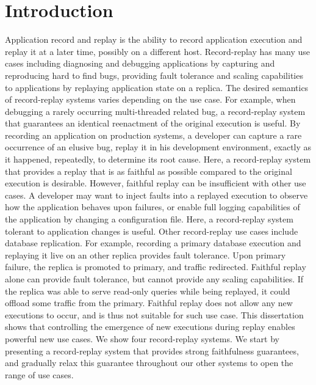 \chapter{Introduction}
\label{ch:intro}

Application record and replay is the ability to record application execution and
replay it at a later time, possibly on a different host. Record-replay has many
use cases including diagnosing and debugging applications by capturing and
reproducing hard to find bugs, providing fault tolerance and scaling
capabilities to applications by replaying application state on a replica.
The desired semantics of record-replay systems varies depending on the use case.
For example, when debugging a rarely occurring multi-threaded related bug,
a record-replay system that guarantees an identical reenactment of the original
execution is useful. By recording an application on production
systems, a developer can capture a rare occurrence of an elusive bug, replay it
in his development environment, exactly as it happened, repeatedly, to
determine its root cause. Here, a record-replay system that provides
a replay that is as faithful as possible compared to the original execution is desirable.
However, faithful replay can be insufficient with other use cases.
A developer may want to inject faults
into a replayed execution to observe how the application behaves upon failures, or
enable full logging capabilities of the application by changing a configuration
file. Here, a record-replay system tolerant to application changes is useful.
Other record-replay use cases include database replication. For example,
recording a primary database execution and replaying it live on an other
replica provides fault tolerance. Upon primary failure, the replica is
promoted to primary, and traffic redirected. Faithful replay alone can
provide fault tolerance, but cannot provide any scaling capabilities.
If the replica was able to serve read-only queries while being replayed,
it could offload some traffic from the primary. Faithful replay does
not allow any new executions to occur, and is thus not suitable for such use case.
This dissertation shows that controlling the emergence of new executions during
replay enables powerful new use cases.
We show four record-replay systems. We start by presenting a record-replay system
that provides strong faithfulness guarantees, and gradually relax this guarantee
throughout our other systems to open the range of use cases.

